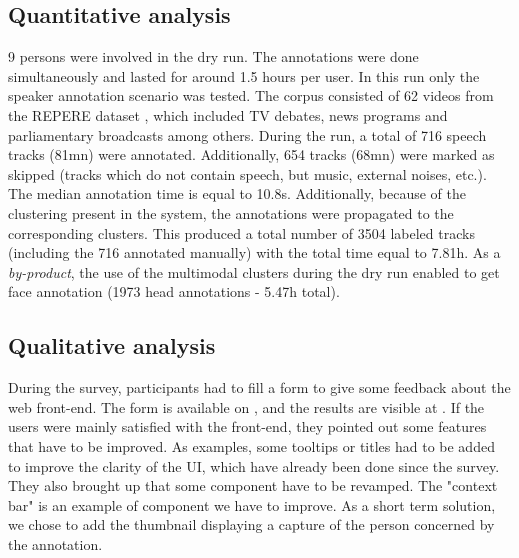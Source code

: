 \documentclass[a4paper]{article}
\begin{document}
      
      \subsection{Quantitative analysis}
 
9 persons were involved in the dry run. The annotations were done simultaneously and lasted for around 1.5 hours per user.
In this run only the speaker annotation scenario was tested. The corpus consisted of 62 videos from the REPERE dataset \cite{giraudel2012repere}, which included TV debates, news programs and parliamentary broadcasts among others.  During the run, a total of 716 speech tracks (81mn) were annotated. Additionally, 654 tracks (68mn) were marked as skipped (tracks which do not contain speech, but music, external noises, etc.). The median annotation time is equal to 10.8s. Additionally, because of the clustering present in the system, the annotations were propagated to the corresponding clusters. This produced a total number of 3504 labeled tracks (including the 716 annotated manually) with the total time equal to 7.81h. As a \textit{by-product}, the use of the multimodal clusters during the dry run enabled to get face annotation (1973 head annotations - 5.47h total). 





 
    

  
        \vspace{-0.2cm}
     \subsection{Qualitative analysis}
        \vspace{-0.1cm}    


During the survey, participants had to fill a form to give some feedback about the web front-end. The form is available on \cite{url-list-form}, and the results are visible at \cite{url-list-form-results}. If the users were mainly satisfied with the front-end, they pointed out some features that have to be improved. As examples, some tooltips or titles had to be added to improve the clarity of the UI, which have already been done since the survey. They also brought up that some component have to be revamped. The "context bar" is an example of component we have to improve. As a short term solution, we chose to add the thumbnail displaying a capture of the person concerned by the annotation.
\end{document}
